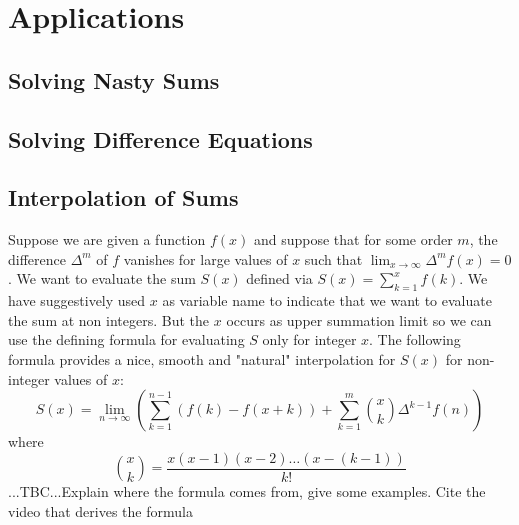 








\section{Applications}

\subsection{Solving Nasty Sums}

\subsection{Solving Difference Equations}


\subsection{Interpolation of Sums}
Suppose we are given a function $f(x)$ and suppose that for some order $m$, the difference $\Delta^m$ of $f$ vanishes for large values of $x$ such that $\lim_{x \rightarrow \infty} \Delta^m f(x) = 0$. We want to evaluate the sum $S(x)$ defined via $S(x) = \sum_{k=1}^{x} f(k)$. We have suggestively used $x$ as variable name to indicate that we want to evaluate the sum at non integers. But the $x$ occurs as upper summation limit so we can use the defining formula for evaluating $S$ only for integer $x$. The following formula provides a nice, smooth and "natural" interpolation for $S(x)$ for non-integer values of $x$:
\begin{equation}
S(x) = \lim_{n \rightarrow \infty} 
\left(   \sum_{k=1}^{n-1} \left(f(k) - f(x+k) \right) 
       + \sum_{k=1}^{m} \binom{x}{k} \Delta^{k-1} f(n)  \right)
\end{equation}
where
\begin{equation}
\binom{x}{k} = \frac{x (x-1) (x-2) \ldots (x-(k-1)) }{k!}
\end{equation}
...TBC...Explain where the formula comes from, give some examples. Cite the video that derives the formula

